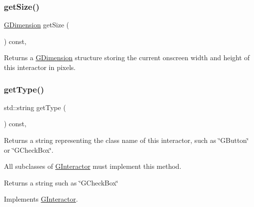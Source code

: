 \subsubsection{\texorpdfstring{get\+Size()}{getSize()}}
{\footnotesize\ttfamily \mbox{\hyperlink{structsgl_1_1GDimension}{G\+Dimension}} get\+Size (\begin{DoxyParamCaption}{ }\end{DoxyParamCaption}) const\hspace{0.3cm}{\ttfamily [virtual]}, {\ttfamily [inherited]}}



Returns a \mbox{\hyperlink{structsgl_1_1GDimension}{G\+Dimension}} structure storing the current onscreen width and height of this interactor in pixels. 

\mbox{\label{classsgl_1_1GCanvas_a9b72ede4ee8520f987a0c01e30654814}} 
\subsubsection{\texorpdfstring{get\+Type()}{getType()}}
{\footnotesize\ttfamily std\+::string get\+Type (\begin{DoxyParamCaption}{ }\end{DoxyParamCaption}) const\hspace{0.3cm}{\ttfamily [override]}, {\ttfamily [virtual]}}



Returns a string representing the class name of this interactor, such as \char`\"{}\+G\+Button\char`\"{} or \char`\"{}\+G\+Check\+Box\char`\"{}. 

All subclasses of \mbox{\hyperlink{classsgl_1_1GInteractor}{G\+Interactor}} must implement this method. \begin{DoxyReturn}{Returns}
a string such as \char`\"{}\+G\+Check\+Box\char`\"{} 
\end{DoxyReturn}


Implements \mbox{\hyperlink{classsgl_1_1GInteractor_a44c407a54a20dd0f2fff30338289299d}{G\+Interactor}}.

\mbox{\label{classsgl_1_1GCanvas_a3b33a602b31a6b809d020535a59db3b4}} 
